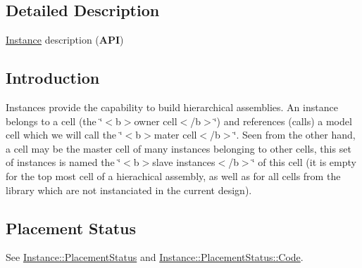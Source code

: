 \subsection{Detailed Description}
\mbox{\hyperlink{classHurricane_1_1Instance}{Instance}} description ({\bfseries A\+PI}) 

\hypertarget{classHurricane_1_1Instance_secInstanceIntro}{}\subsection{Introduction}\label{classHurricane_1_1Instance_secInstanceIntro}
Instances provide the capability to build hierarchical assemblies. An instance belongs to a cell (the \char`\"{}$<$b$>$owner 
              cell$<$/b$>$\char`\"{}) and references (calls) a model cell which we will call the \char`\"{}$<$b$>$mater cell$<$/b$>$\char`\"{}. Seen from the other hand, a cell may be the master cell of many instances belonging to other cells, this set of instances is named the \char`\"{}$<$b$>$slave 
              instances$<$/b$>$\char`\"{} of this cell (it is empty for the top most cell of a hierachical assembly, as well as for all cells from the library which are not instanciated in the current design).\hypertarget{classHurricane_1_1Instance_secInstancePlacement}{}\subsection{Placement Status}\label{classHurricane_1_1Instance_secInstancePlacement}
See \mbox{\hyperlink{classHurricane_1_1Instance_1_1PlacementStatus}{Instance\+::\+Placement\+Status}} and \mbox{\hyperlink{classHurricane_1_1Instance_1_1PlacementStatus_af76cc0838783b3eb3a515eb3c3e0f7bf}{Instance\+::\+Placement\+Status\+::\+Code}}.

